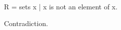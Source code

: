 
\begin{forthel}
  \begin{definition}
    R = { sets x | x is not an element of x}.
  \end{definition}

  \begin{theorem}
    Contradiction.
  \end{theorem}
\end{forthel}
